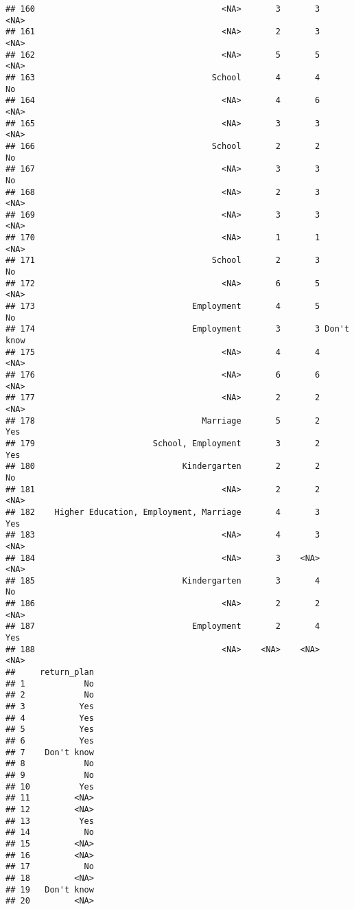 \documentclass[
]{article}
\begin{document}
\begin{verbatim}
## 160                                      <NA>       3       3       <NA>
## 161                                      <NA>       2       3       <NA>
## 162                                      <NA>       5       5       <NA>
## 163                                    School       4       4         No
## 164                                      <NA>       4       6       <NA>
## 165                                      <NA>       3       3       <NA>
## 166                                    School       2       2         No
## 167                                      <NA>       3       3         No
## 168                                      <NA>       2       3       <NA>
## 169                                      <NA>       3       3       <NA>
## 170                                      <NA>       1       1       <NA>
## 171                                    School       2       3         No
## 172                                      <NA>       6       5       <NA>
## 173                                Employment       4       5         No
## 174                                Employment       3       3 Don't know
## 175                                      <NA>       4       4       <NA>
## 176                                      <NA>       6       6       <NA>
## 177                                      <NA>       2       2       <NA>
## 178                                  Marriage       5       2        Yes
## 179                        School, Employment       3       2        Yes
## 180                              Kindergarten       2       2         No
## 181                                      <NA>       2       2       <NA>
## 182    Higher Education, Employment, Marriage       4       3        Yes
## 183                                      <NA>       4       3       <NA>
## 184                                      <NA>       3    <NA>       <NA>
## 185                              Kindergarten       3       4         No
## 186                                      <NA>       2       2       <NA>
## 187                                Employment       2       4        Yes
## 188                                      <NA>    <NA>    <NA>       <NA>
##     return_plan
## 1            No
## 2            No
## 3           Yes
## 4           Yes
## 5           Yes
## 6           Yes
## 7    Don't know
## 8            No
## 9            No
## 10          Yes
## 11         <NA>
## 12         <NA>
## 13          Yes
## 14           No
## 15         <NA>
## 16         <NA>
## 17           No
## 18         <NA>
## 19   Don't know
## 20         <NA>

\end{verbatim}
\end{document}

